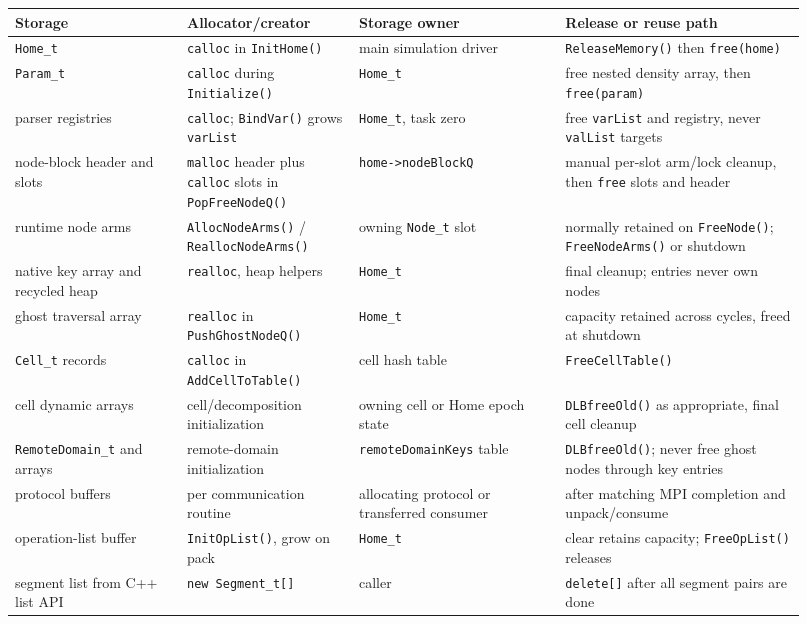 \documentclass[11pt]{article}
\newcommand{\code}[1]{\texorpdfstring{\nolinkurl{#1}}{#1}}
\begin{document}
\small
\begin{longtable}{@{}p{0.20\linewidth}p{0.20\linewidth}p{0.24\linewidth}p{0.28\linewidth}@{}}
\toprule
Storage & Allocator/creator & Storage owner & Release or reuse path \\
\midrule
\endhead
\code{Home_t} & \code{calloc} in \code{InitHome()} & main simulation driver &
\code{ReleaseMemory()} then \code{free(home)} \\
\code{Param_t} & \code{calloc} during \code{Initialize()} & \code{Home_t} &
free nested density array, then \code{free(param)} \\
parser registries & \code{calloc}; \code{BindVar()} grows \code{varList} &
\code{Home_t}, task zero & free \code{varList} and registry, never
\code{valList} targets \\
node-block header and slots & \code{malloc} header plus \code{calloc} slots in
\code{PopFreeNodeQ()} & \code{home->nodeBlockQ} & manual per-slot arm/lock
cleanup, then \code{free} slots and header \\
runtime node arms & \code{AllocNodeArms()} / \code{ReallocNodeArms()} & owning
\code{Node_t} slot & normally retained on \code{FreeNode()};
\code{FreeNodeArms()} or shutdown \\
native key array and recycled heap & \code{realloc}, heap helpers &
\code{Home_t} & final cleanup; entries never own nodes \\
ghost traversal array & \code{realloc} in \code{PushGhostNodeQ()} &
\code{Home_t} & capacity retained across cycles, freed at shutdown \\
\code{Cell_t} records & \code{calloc} in \code{AddCellToTable()} & cell hash
table & \code{FreeCellTable()} \\
cell dynamic arrays & cell/decomposition initialization & owning cell or Home
epoch state & \code{DLBfreeOld()} as appropriate, final cell cleanup \\
\code{RemoteDomain_t} and arrays & remote-domain initialization &
\code{remoteDomainKeys} table & \code{DLBfreeOld()}; never free ghost nodes
through key entries \\
protocol buffers & per communication routine & allocating protocol or
transferred consumer & after matching MPI completion and unpack/consume \\
operation-list buffer & \code{InitOpList()}, grow on pack & \code{Home_t} &
clear retains capacity; \code{FreeOpList()} releases \\
segment list from C++ list API & \code{new Segment_t[]} & caller &
\code{delete[]} after all segment pairs are done \\

\end{longtable}
\end{document}
